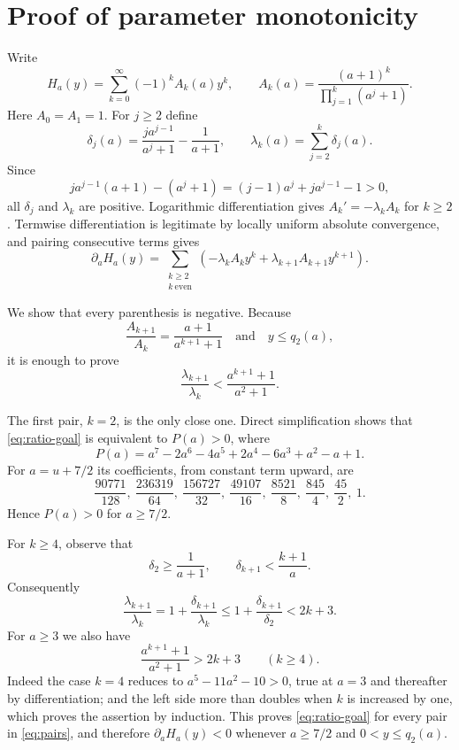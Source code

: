 \documentclass[11pt]{article}
\begin{document}
\section{Proof of parameter monotonicity}

Write
\[
 H_a(y)=\sum_{k=0}^{\infty}(-1)^k A_k(a)y^k,
 \qquad
 A_k(a)=\frac{(a+1)^k}{\prod_{j=1}^k(a^j+1)}.
\]
Here $A_0=A_1=1$.  For $j\geq2$ define
\[
 \delta_j(a)=\frac{j a^{j-1}}{a^j+1}-\frac1{a+1},
 \qquad
 \lambda_k(a)=\sum_{j=2}^k\delta_j(a).
\]
Since
\[
 j a^{j-1}(a+1)-(a^j+1)
 =(j-1)a^j+j a^{j-1}-1>0,
\]
all $\delta_j$ and $\lambda_k$ are positive.  Logarithmic differentiation
gives $A_k'=-\lambda_kA_k$ for $k\geq2$.  Termwise differentiation is
legitimate by locally uniform absolute convergence, and pairing consecutive
terms gives
\begin{equation}\label{eq:pairs}
 \partial_aH_a(y)=\sum_{\substack{k\geq2\\k\ \mathrm{even}}}
 \left(-\lambda_kA_ky^k+\lambda_{k+1}A_{k+1}y^{k+1}\right).
\end{equation}

We show that every parenthesis is negative.  Because
\[
 \frac{A_{k+1}}{A_k}=\frac{a+1}{a^{k+1}+1}
 \quad\text{and}\quad y\leq q_2(a),
\]
it is enough to prove
\begin{equation}\label{eq:ratio-goal}
 \frac{\lambda_{k+1}}{\lambda_k}
 <\frac{a^{k+1}+1}{a^2+1}.
\end{equation}

The first pair, $k=2$, is the only close one.  Direct simplification shows
that \eqref{eq:ratio-goal} is equivalent to $P(a)>0$, where
\[
 P(a)=a^7-2a^6-4a^5+2a^4-6a^3+a^2-a+1.
\]
For $a=u+7/2$ its coefficients, from constant term upward, are
\[
 \frac{90771}{128},\ \frac{236319}{64},\ \frac{156727}{32},\
 \frac{49107}{16},\ \frac{8521}{8},\ \frac{845}{4},\
 \frac{45}{2},\ 1.
\]
Hence $P(a)>0$ for $a\geq7/2$.

For $k\geq4$, observe that
\[
 \delta_2\geq\frac1{a+1},\qquad
 \delta_{k+1}<\frac{k+1}{a}.
\]
Consequently
\[
 \frac{\lambda_{k+1}}{\lambda_k}
 =1+\frac{\delta_{k+1}}{\lambda_k}
 \leq1+\frac{\delta_{k+1}}{\delta_2}<2k+3.
\]
For $a\geq3$ we also have
\[
 \frac{a^{k+1}+1}{a^2+1}>2k+3\qquad(k\geq4).
\]
Indeed the case $k=4$ reduces to $a^5-11a^2-10>0$, true at
$a=3$ and thereafter by differentiation; and the left side more than
doubles when $k$ is increased by one, which proves the assertion by
induction.  This proves \eqref{eq:ratio-goal} for every pair in
\eqref{eq:pairs}, and therefore $\partial_aH_a(y)<0$ whenever
$a\geq7/2$ and $0<y\leq q_2(a)$.
\end{document}
